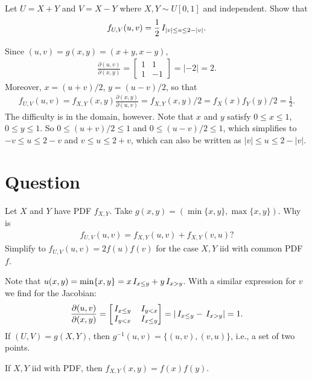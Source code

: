 \begin{exercise}
Let $U=X+Y$ and $V=X-Y$ where $X,Y\sim U[0,1]$ and independent. Show that
\begin{align*}
f_{U,V}(u,v) = \frac 12 \,I_{|v| \leq u \leq 2-|v|}.
\end{align*}
\begin{solution}
Since $(u,v) = g(x,y)  = (x+y, x-y)$,
\begin{align*}
\frac{\partial(u,v)}{\partial(x,y)} =
\begin{bmatrix}
1 & 1 \\
1 & -1
\end{bmatrix} = |-2| =2.
\end{align*}
Moreover, $x=(u+v)/2$, $y=(u-v)/2$, so that
\begin{align*}
f_{U,V}(u,v) = f_{X,Y}(x,y) \frac{\partial(x,y)}{\partial(u,v)} = f_{X,Y}(x,y)/2 = f_X(x) f_Y(y)/2 = \frac 1 2.
\end{align*}
The difficulty is in the domain, however. Note that $x$ and $y$ satisfy $0 \leq x \leq 1$, $0 \leq y \leq 1$.
So $0 \leq (u+v)/2 \leq 1$ and $0 \leq (u-v)/2 \leq 1$, which simplifies to $-v \leq u \leq 2-v$ and $v \leq u \leq 2+v$, which can also be written as $|v| \leq u \leq 2-|v|$.
\end{solution}
\end{exercise}

\section*{Question}

\begin{exercise}
Let $X$ and $Y$ have PDF $f_{X,Y}$. Take $g(x,y) = (\min\{x,y\}, \max\{x,y\})$.
Why is
\begin{align*}
f_{U,V}(u,v) = f_{X,Y}(u, v) + f_{X,Y}(v, u)?
\end{align*}
Simplify to $f_{U,V}(u,v) = 2f(u)f(v)$ for the case $X, Y$ iid with common PDF $f$.
\begin{solution}
Note that $u(x,y)=\min\{x,y\} = x\,I_{x\leq y} + y\,I_{x> y}$. With a similar expression for $v$ we find for the Jacobian:
\begin{align*}
\frac{\partial(u,v)}{\partial(x,y)} =
\begin{bmatrix}
\,I_{x\leq y} & \,I_{y < x} \\
\,I_{y<x} & \,I_{x\leq y}
\end{bmatrix} = |\,I_{x\leq y} - \,I_{x>y}| = 1.
\end{align*}
If $(U,V) = g(X,Y)$, then $g^{-1}(u,v) = \{(u,v), (v,u)\}$, i.e., a set of two points.

If $X,Y$ iid with PDF, then $f_{X,Y}(x,y) = f(x)f(y)$.
\end{solution}
\end{exercise}

